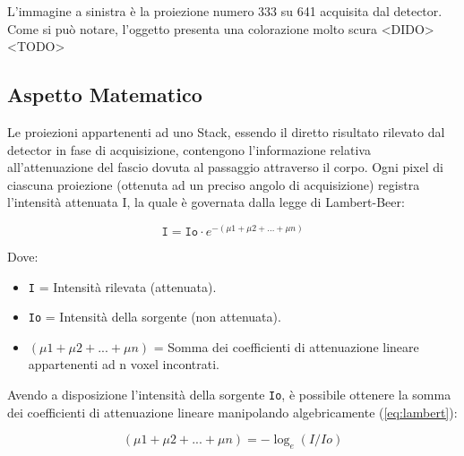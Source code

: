 \documentclass[a4paper,11pt, oneside]{article}
\begin{document}
                L'immagine a sinistra è la proiezione numero 333 su 641 acquisita dal detector. Come si può notare, l'oggetto presenta una colorazione molto scura
                <DIDO> <TODO>
                
            
            \subsection{Aspetto Matematico}
                \par
                    Le proiezioni appartenenti ad uno Stack, essendo il diretto risultato rilevato dal detector in fase di acquisizione, contengono l'informazione relativa all'attenuazione del fascio dovuta al passaggio attraverso il corpo. Ogni pixel di ciascuna proiezione (ottenuta ad un preciso angolo di acquisizione) registra l'intensità attenuata I, la quale è governata dalla legge di Lambert-Beer\cite{lambert-beer}:

                    \begin{equation} \label{eq:lambert}
                        \texttt{I} = \texttt{Io} \cdot e^{- (\mu1 + \mu2 + ...  + \mu n)}
                    \end{equation}
                    
                    Dove:
                    \begin{itemize}
                      \item \texttt{I} = Intensità rilevata (attenuata).
                      \item \texttt{Io} = Intensità della sorgente (non attenuata).
                      \item \texttt{$ (\mu1 + \mu2 + ... + \mu n) $} = Somma dei coefficienti di attenuazione lineare appartenenti ad n voxel incontrati.
                    \end{itemize}
                    
                \par
                    Avendo a disposizione l'intensità della sorgente \texttt{Io}, è possibile ottenere la somma dei coefficienti di attenuazione lineare manipolando algebricamente (\ref{eq:lambert}):
                    
                    \begin{equation} \label{eq:normalization}
                        (\mu1 + \mu2 + ... + \mu n) = - \log_e{(I/Io)}
                    \end{equation}
                    
\end{document}
